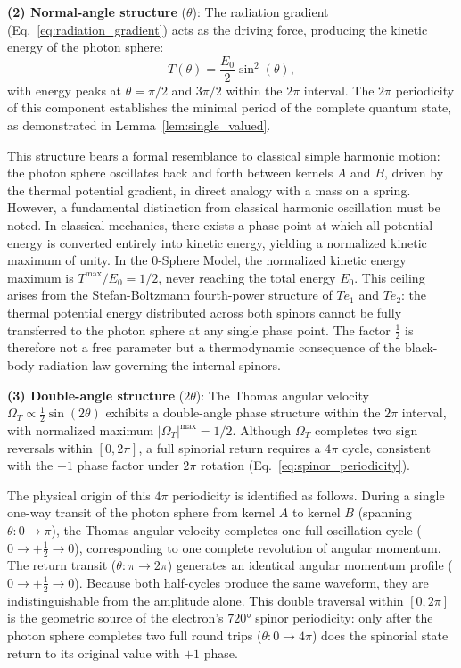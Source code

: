 \documentclass[%
 reprint,
 amsmath,amssymb,
 aps,
 prb,
]{revtex4-2}
\numberwithin{equation}{section}
\theoremstyle{definition}
\theoremstyle{remark}
\begin{document}
\textbf{(2) Normal-angle structure} ($\theta$): The radiation gradient (Eq.~\ref{eq:radiation_gradient}) acts as the driving force, producing the kinetic energy of the photon sphere:
\begin{equation}
T(\theta) = \frac{E_0}{2}\sin^2(\theta),
\end{equation}
with energy peaks at $\theta = \pi/2$ and $3\pi/2$ within the $2\pi$ interval. The $2\pi$ periodicity of this component establishes the minimal period of the complete quantum state, as demonstrated in Lemma~\ref{lem:single_valued}.

This structure bears a formal resemblance to classical simple harmonic motion: the photon sphere oscillates back and forth between kernels $A$ and $B$, driven by the thermal potential gradient, in direct analogy with a mass on a spring. However, a fundamental distinction from classical harmonic oscillation must be noted. In classical mechanics, there exists a phase point at which all potential energy is converted entirely into kinetic energy, yielding a normalized kinetic maximum of unity. In the 0-Sphere Model, the normalized kinetic energy maximum is $T^{\max}/E_0 = 1/2$, never reaching the total energy $E_0$. This ceiling arises from the Stefan-Boltzmann fourth-power structure of $Te_1$ and $Te_2$: the thermal potential energy distributed across both spinors cannot be fully transferred to the photon sphere at any single phase point. The factor $\frac{1}{2}$ is therefore not a free parameter but a thermodynamic consequence of the black-body radiation law governing the internal spinors.

\textbf{(3) Double-angle structure} ($2\theta$): The Thomas angular velocity $\Omega_T \propto \frac{1}{2}\sin(2\theta)$ exhibits a double-angle phase structure within the $2\pi$ interval, with normalized maximum $|\Omega_T|^{\max} = 1/2$. Although $\Omega_T$ completes two sign reversals within $[0, 2\pi]$, a full spinorial return requires a $4\pi$ cycle, consistent with the $-1$ phase factor under $2\pi$ rotation (Eq.~\ref{eq:spinor_periodicity}).

The physical origin of this $4\pi$ periodicity is identified as follows. During a single one-way transit of the photon sphere from kernel $A$ to kernel $B$ (spanning $\theta: 0 \to \pi$), the Thomas angular velocity completes one full oscillation cycle ($0 \to +\tfrac{1}{2} \to 0$), corresponding to one complete revolution of angular momentum. The return transit ($\theta: \pi \to 2\pi$) generates an identical angular momentum profile ($0 \to +\tfrac{1}{2} \to 0$). Because both half-cycles produce the same waveform, they are indistinguishable from the amplitude alone. This double traversal within $[0, 2\pi]$ is the geometric source of the electron's $720°$ spinor periodicity: only after the photon sphere completes two full round trips ($\theta: 0 \to 4\pi$) does the spinorial state return to its original value with $+1$ phase.
\end{document}
